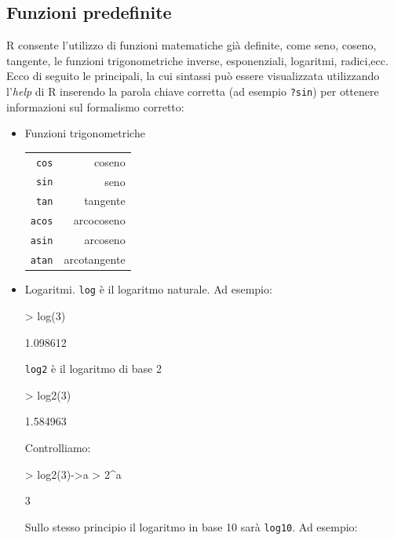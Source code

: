 \documentclass[onecolumn,11pt]{book}
\begin{document}
\subsection{Funzioni predefinite}  
\textsf{R} consente l'utilizzo di funzioni matematiche gi\`a definite, come seno, coseno, tangente, le funzioni trigonometriche inverse, esponenziali, logaritmi, radici,ecc.
Ecco di seguito le principali, la cui sintassi pu\`o essere visualizzata utilizzando l'\emph {help} di \textsf{R} inserendo la parola chiave corretta (ad esempio \texttt{?sin}) per ottenere informazioni sul formalismo corretto:  
\begin{itemize}
 \item{}
 Funzioni trigonometriche\hfill\vskip10pt
 \begin{tabular}{|r r |}\hline
\texttt{cos}&  coseno\\
\texttt{sin}& seno\\
\texttt{tan}&   tangente\\
\texttt{acos}&   arcocoseno\\
\texttt{asin}&   arcoseno\\
\texttt{atan} &  arcotangente\\
\hline
\end{tabular}
\item{}Logaritmi.\vskip10pt
\texttt{log} \`e il  logaritmo naturale. Ad esempio:
\begin{Schunk}
\begin{Sinput}
> log(3)
\end{Sinput}
\begin{Soutput}
[1] 1.098612
\end{Soutput}
\end{Schunk}
\texttt{log2} \`e il logaritmo di base 2 
\begin{Schunk}
\begin{Sinput}
> log2(3)
\end{Sinput}
\begin{Soutput}
[1] 1.584963
\end{Soutput}
\end{Schunk}
Controlliamo:  
\begin{Schunk}
\begin{Sinput}
> log2(3)->a
> 2^a
\end{Sinput}
\begin{Soutput}
[1] 3
\end{Soutput}
\end{Schunk}
 Sullo stesso principio il logaritmo in base 10 sar\`a
\texttt{log10}. Ad
esempio:
\begin{Schunk}

\end{Schunk}
\end{itemize}
\end{document}
